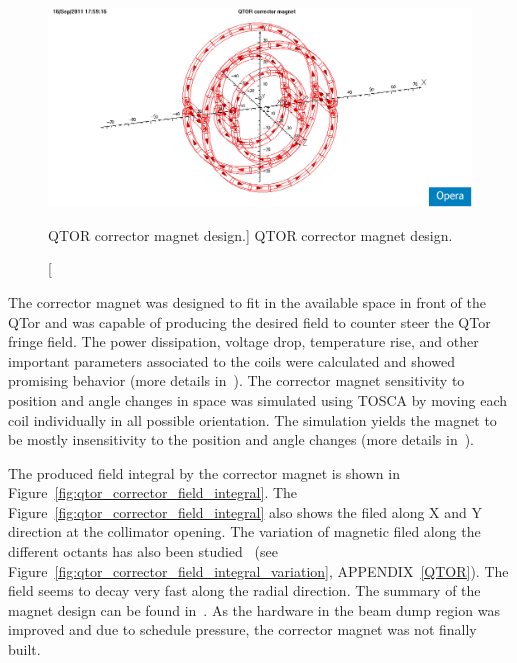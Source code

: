 \begin{figure}[!h]
	\begin{center}
		\includegraphics[width=15.0cm]{figures/qtor_corrector_vector}
	\end{center}
		\caption
		[QTOR corrector magnet design.]
		{QTOR corrector magnet design.}
		\label{fig:qtor_corrector_vector}
\end{figure}

The corrector magnet was designed to fit in the available space in front of the QTor and was capable of producing the desired field to counter steer the QTor fringe field. The power dissipation, voltage drop, temperature rise, and other important parameters associated to the coils were calculated and showed promising behavior (more details in~\cite{elog:nur_qtor9}). The corrector magnet sensitivity to position and angle changes in space was simulated using TOSCA by moving each coil individually in all possible orientation. The simulation yields the magnet to be mostly insensitivity to the position and angle changes (more details in~\cite{elog:nur_qtor10}). 

The produced field integral by the corrector magnet is shown in Figure~\ref{fig:qtor_corrector_field_integral}. The Figure~\ref{fig:qtor_corrector_field_integral} also shows the filed along X and Y direction at the collimator opening. The variation of magnetic filed along the different octants has also been studied~\cite{elog:nur_qtor11} (see Figure~\ref{fig:qtor_corrector_field_integral_variation}, APPENDIX~\ref{QTOR}). The field seems to decay very fast along the radial direction. The summary of the magnet design can be found in~\cite{elog:nur_qtor12}. As the hardware in the beam dump region was improved and due to schedule pressure, the corrector magnet was not finally built.



